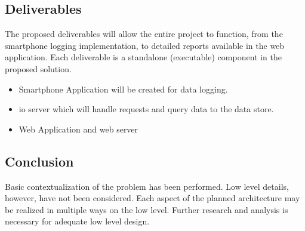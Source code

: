 \subsection{Deliverables}
The proposed deliverables will allow the entire project to function, from the smartphone logging implementation, to detailed reports available in the web application. 
Each deliverable is a standalone (executable) component in the proposed solution.
\begin{itemize}
\item Smartphone Application will be created for data logging.
\item \Ac{io} server which will handle requests and query data to the data store.
\item Web Application and web server
\end{itemize}

\subsection{Conclusion}
Basic contextualization of the problem has been performed.
Low level details, however, have not been considered.
Each aspect of the planned architecture may be realized in multiple ways on the low level.
Further research and analysis is necessary for adequate low level design.

\pagebreak
